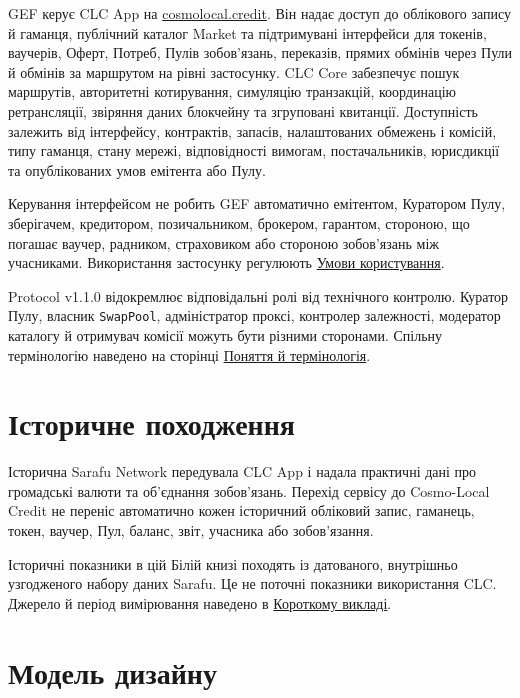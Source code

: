 \documentclass[11pt]{article}
\begin{document}
GEF керує CLC App на \href{https://cosmolocal.credit}{cosmolocal.credit}. Він надає доступ до облікового запису й гаманця, публічний каталог Market та підтримувані інтерфейси для токенів, ваучерів, Оферт, Потреб, Пулів зобов'язань, переказів, прямих обмінів через Пули й обмінів за маршрутом на рівні застосунку. CLC Core забезпечує пошук маршрутів, авторитетні котирування, симуляцію транзакцій, координацію ретрансляції, звіряння даних блокчейну та згруповані квитанції. Доступність залежить від інтерфейсу, контрактів, запасів, налаштованих обмежень і комісій, типу гаманця, стану мережі, відповідності вимогам, постачальників, юрисдикції та опублікованих умов емітента або Пулу.

Керування інтерфейсом не робить GEF автоматично емітентом, Куратором Пулу, зберігачем, кредитором, позичальником, брокером, гарантом, стороною, що погашає ваучер, радником, страховиком або стороною зобов'язань між учасниками. Використання застосунку регулюють \href{https://docs.cosmolocal.credit/uk/governance/terms}{Умови користування}.

Protocol v1.1.0 відокремлює відповідальні ролі від технічного контролю. Куратор Пулу, власник \texttt{SwapPool}, адміністратор проксі, контролер залежності, модератор каталогу й отримувач комісії можуть бути різними сторонами. Спільну термінологію наведено на сторінці \href{https://docs.cosmolocal.credit/uk/introduction/concepts}{Поняття й термінологія}.

\section*{Історичне походження}

Історична Sarafu Network передувала CLC App і надала практичні дані про громадські валюти та об'єднання зобов'язань. Перехід сервісу до Cosmo-Local Credit не переніс автоматично кожен історичний обліковий запис, гаманець, токен, ваучер, Пул, баланс, звіт, учасника або зобов'язання.

Історичні показники в цій Білій книзі походять із датованого, внутрішньо узгодженого набору даних Sarafu. Це не поточні показники використання CLC. Джерело й період вимірювання наведено в \href{https://docs.cosmolocal.credit/uk/white-paper/executive-summary}{Короткому викладі}.

\section*{Модель дизайну}
\end{document}
